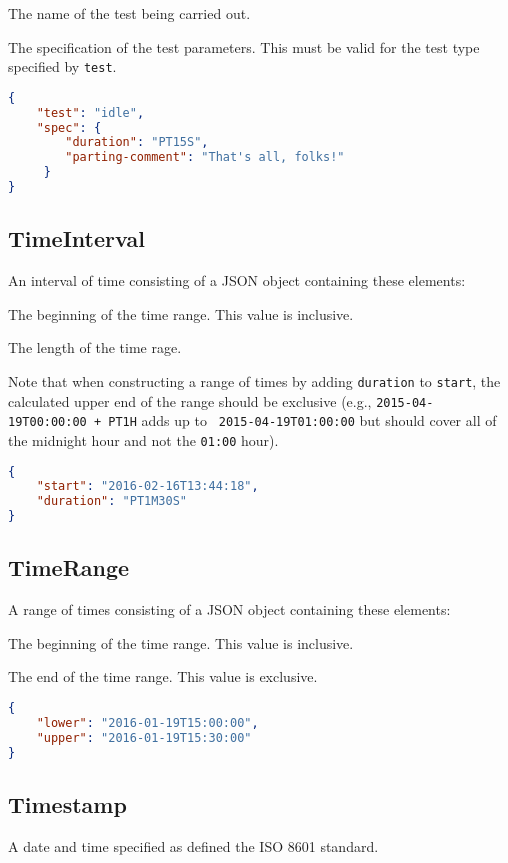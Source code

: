 \documentclass[10pt]{article}
\begin{document}
 The name of the test being carried out.

 The specification of the test parameters.
This must be valid for the test type specified by {\tt test}.

\example
\begin{lstlisting}[language=json]
{
    "test": "idle",
    "spec": {
        "duration": "PT15S",
        "parting-comment": "That's all, folks!"
     }
}
\end{lstlisting}




\subsection{TimeInterval}
An interval of time consisting of a JSON object containing these
elements:

 The beginning of the time range.  This
value is inclusive.

 The length of the time rage.

Note that when constructing a range of times by adding {\tt duration}
to {\tt start}, the calculated upper end of the range should be
exclusive (e.g., {\tt 2015-04-19T00:00:00 + PT1H} adds up to {\tt
  2015-04-19T01:00:00} but should cover all of the midnight hour and
not the {\tt 01:00} hour).

\example
\begin{lstlisting}[language=json]
{
    "start": "2016-02-16T13:44:18",
    "duration": "PT1M30S"
}
\end{lstlisting}


\subsection{TimeRange}
A range of times consisting of a JSON object containing these
elements:

 The beginning of the time range.  This
value is inclusive.

 The end of the time range.  This
value is exclusive.

\example
\begin{lstlisting}[language=json]
{
    "lower": "2016-01-19T15:00:00",
    "upper": "2016-01-19T15:30:00"
}
\end{lstlisting}


\subsection{Timestamp}
A date and time specified as defined the ISO 8601 standard.
\end{document}
